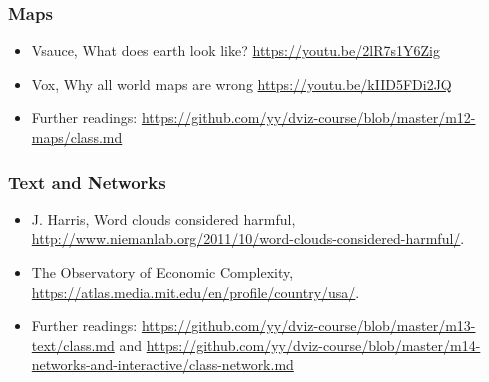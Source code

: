 \subsubsection{Maps }%

\begin{itemize}\itemsep0em 
\item Vsauce, What does earth look like? \url{https://youtu.be/2lR7s1Y6Zig}
\item Vox, Why all world maps are wrong \url{https://youtu.be/kIID5FDi2JQ}
\item Further readings: \url{https://github.com/yy/dviz-course/blob/master/m12-maps/class.md}
\end{itemize}	
\subsubsection{Text and Networks } %

\begin{itemize}\itemsep0em 
\item J. Harris, Word clouds considered harmful,\\ \url{http://www.niemanlab.org/2011/10/word-clouds-considered-harmful/}. 
\item The Observatory of Economic Complexity, \url{https://atlas.media.mit.edu/en/profile/country/usa/}.
\item Further readings: \url{https://github.com/yy/dviz-course/blob/master/m13-text/class.md} and \url{https://github.com/yy/dviz-course/blob/master/m14-networks-and-interactive/class-network.md}
\end{itemize}	


